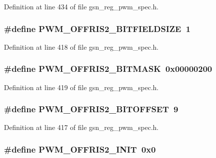 Definition at line 434 of file gsn\_\-reg\_\-pwm\_\-spec.h.

\hypertarget{a00565_aaf2b16c29029a880d26f35958de998e2}{
\subsubsection[{PWM\_\-OFFRIS2\_\-BITFIELDSIZE}]{\setlength{\rightskip}{0pt plus 5cm}\#define PWM\_\-OFFRIS2\_\-BITFIELDSIZE~1}}
\label{a00565_aaf2b16c29029a880d26f35958de998e2}


Definition at line 418 of file gsn\_\-reg\_\-pwm\_\-spec.h.

\hypertarget{a00565_a88f29da4b8d1eaa79468e653981c0aa6}{
\subsubsection[{PWM\_\-OFFRIS2\_\-BITMASK}]{\setlength{\rightskip}{0pt plus 5cm}\#define PWM\_\-OFFRIS2\_\-BITMASK~0x00000200}}
\label{a00565_a88f29da4b8d1eaa79468e653981c0aa6}


Definition at line 419 of file gsn\_\-reg\_\-pwm\_\-spec.h.

\hypertarget{a00565_a8e66e84d67e008997e47171daaeaa747}{
\subsubsection[{PWM\_\-OFFRIS2\_\-BITOFFSET}]{\setlength{\rightskip}{0pt plus 5cm}\#define PWM\_\-OFFRIS2\_\-BITOFFSET~9}}
\label{a00565_a8e66e84d67e008997e47171daaeaa747}


Definition at line 417 of file gsn\_\-reg\_\-pwm\_\-spec.h.

\hypertarget{a00565_ae51673cd2a9d20e9f46ac3ac54361084}{
\subsubsection[{PWM\_\-OFFRIS2\_\-INIT}]{\setlength{\rightskip}{0pt plus 5cm}\#define PWM\_\-OFFRIS2\_\-INIT~0x0}}
\label{a00565_ae51673cd2a9d20e9f46ac3ac54361084}


